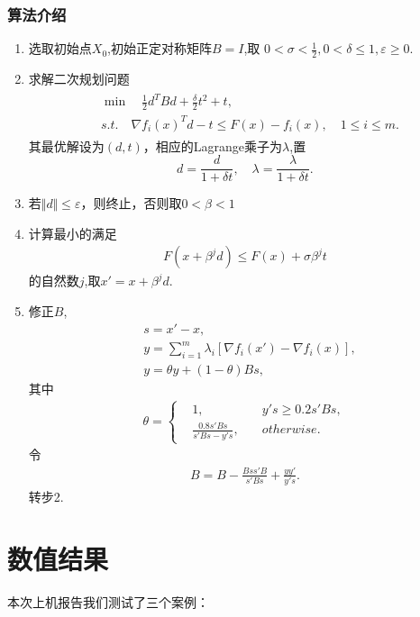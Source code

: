 \documentclass[a4paper,  11pt]{ctexart}
\begin{document}
\subsubsection*{算法介绍}
\begin{enumerate}
  \item 选取初始点$X_0$,初始正定对称矩阵$B=I$,取
    $0<\sigma<\frac{1}{2},0<\delta\leq 1,\varepsilon\geq 0$.
  \item 求解二次规划问题
    \begin{align}
      \begin{aligned}
        &\min \quad  \frac 12 d^TBd + \frac{\delta}{2}t^2 + t,\\
        &s.t. \quad \nabla f_i(x)^Td-t\leq F(x)-f_i(x),\quad 1\leq
        i\leq m.
      \end{aligned}
    \end{align}
  其最优解设为$(d,t)$，相应的Lagrange乘子为$\lambda$,置
  \[ 
    d = \frac{d}{1+\delta t},\quad \lambda = \frac{\lambda}{1+\delta
    t}.
  \]
\item 若$\Vert d\Vert\leq \varepsilon$，则终止，否则取$0<\beta<1$
\item 计算最小的满足
  \begin{align}
    F(x+\beta^jd)\leq F(x) + \sigma\beta^j t
  \end{align}
  的自然数$j$,取$x' = x+\beta^jd$.
  \item 修正$B$,
    \begin{align*}
      &s = x'-x,\\
      &y = \sum_{i=1}^m \lambda_i \left[
      \nabla f_i(x')-\nabla f_i(x)
      \right],\\
      &y = \theta y+(1-\theta)Bs,
    \end{align*}
    其中 
    \begin{align*}
      \theta = \left\{
      \begin{aligned}
        &1,\quad &y's\geq 0.2s'Bs,\\
        &\frac{0.8s'Bs}{s'Bs-y's},\quad &otherwise.
      \end{aligned}
      \right.
    \end{align*}
    令
    \begin{align}
      B = B - \frac{Bss'B}{s'Bs}+\frac{yy'}{y's}.
    \end{align}
    转步2.
\end{enumerate}
\section{数值结果}
本次上机报告我们测试了三个案例：
\end{document}

